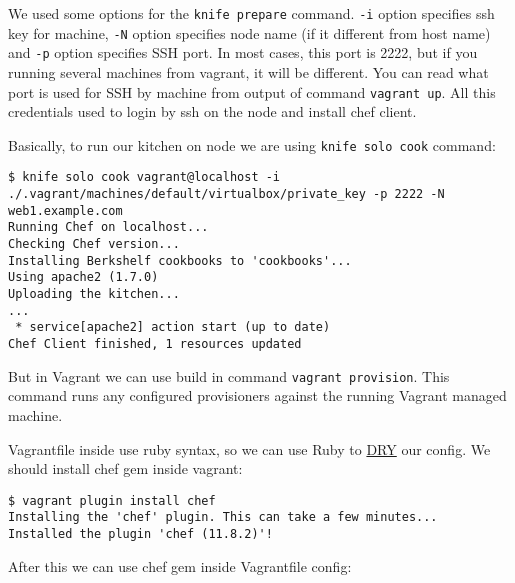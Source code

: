 We used some options for the \lstinline!knife prepare! command. \lstinline!-i! option specifies ssh key for machine, \lstinline!-N! option specifies node name (if it different from host name) and \lstinline!-p! option specifies SSH port. In most cases, this port is 2222, but if you running several machines from vagrant, it will be different. You can read what port is used for SSH by machine from output of command \lstinline!vagrant up!. All this credentials used to login by ssh on the node and install chef client.

Basically, to run our kitchen on node we are using \lstinline!knife solo cook! command:

\begin{lstlisting}[label=lst:my-cloud-vagrant11]
$ knife solo cook vagrant@localhost -i ./.vagrant/machines/default/virtualbox/private_key -p 2222 -N web1.example.com
Running Chef on localhost...
Checking Chef version...
Installing Berkshelf cookbooks to 'cookbooks'...
Using apache2 (1.7.0)
Uploading the kitchen...
...
 * service[apache2] action start (up to date)
Chef Client finished, 1 resources updated
\end{lstlisting}

But in Vagrant we can use build in command \lstinline!vagrant provision!. This command runs any configured provisioners against the running Vagrant managed machine.

Vagrantfile inside use ruby syntax, so we can use Ruby to \href{http://en.wikipedia.org/wiki/Dont\_repeat\_yourself}{DRY} our config. We should install chef gem inside vagrant:

\begin{lstlisting}[label=lst:my-cloud-vagrant6]
$ vagrant plugin install chef
Installing the 'chef' plugin. This can take a few minutes...
Installed the plugin 'chef (11.8.2)'!
\end{lstlisting}

After this we can use chef gem inside Vagrantfile config:

